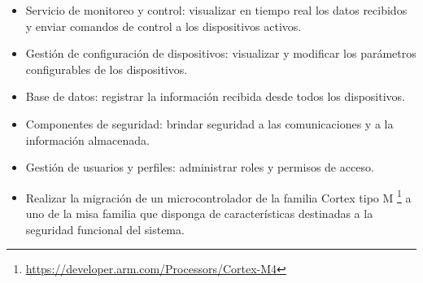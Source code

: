 \begin{itemize}
	\item Servicio de monitoreo y control: visualizar en tiempo real los datos recibidos y enviar comandos de control a los dispositivos activos. 

    \item Gestión de configuración de dispositivos: visualizar y modificar los parámetros configurables de los dispositivos. 

    \item Base de datos: registrar la información recibida desde todos los dispositivos.

    \item Componentes de seguridad: brindar seguridad a las comunicaciones y a la información almacenada. 

    \item Gestión de usuarios y perfiles: administrar roles y permisos de acceso.

    \item Realizar la migración de un microcontrolador de la familia Cortex tipo M \footnote{\url{https://developer.arm.com/Processors/Cortex-M4}} a uno de la misa familia que disponga de características destinadas a la seguridad funcional del sistema. 
\end{itemize}

